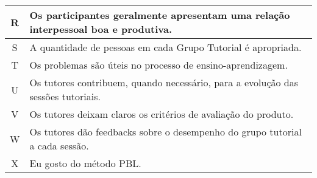 \begin{table}[h]
\begin{tabular}{c|p{14.6cm}}
\hline
R & Os participantes geralmente apresentam uma relação interpessoal boa e produtiva.\\
\hline
S & A quantidade de pessoas em cada Grupo Tutorial é apropriada.\\
\hline
T & Os problemas são úteis no processo de ensino-aprendizagem.\\
\hline
U & Os tutores contribuem, quando necessário, para a evolução das sessões tutoriais.\\
\hline
V & Os tutores deixam claros os critérios de avaliação do produto.\\
\hline
W & Os tutores dão feedbacks sobre o desempenho do grupo tutorial a cada sessão.\\
\hline
X & Eu gosto do método PBL.\\
\end{tabular}
\end{table}
